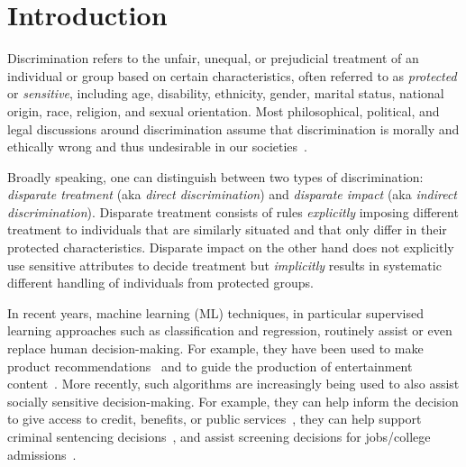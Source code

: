 \documentclass[letterpaper]{article} %
\theoremstyle{definition}
\newcommand{\1}{\ensuremath{{\rm e}}} %
\begin{document}
\section{Introduction}
\label{sec:introduction}

Discrimination refers to the unfair, unequal, or prejudicial treatment of an individual or group based on certain characteristics, often referred to as \emph{protected} or \emph{sensitive}, including age, disability, ethnicity, gender, marital status, national origin, race, religion, and sexual orientation. Most philosophical, political, and legal discussions around discrimination assume that discrimination is morally and ethically wrong and thus undesirable in our societies~\cite{sep-discrimination}. 

Broadly speaking, one can distinguish between two types of discrimination: \emph{disparate treatment} (aka \emph{direct discrimination}) and \emph{disparate impact} (aka \emph{indirect discrimination}). Disparate treatment consists of rules \emph{explicitly} imposing different treatment to individuals that are similarly situated and that only differ in their protected characteristics. Disparate impact on the other hand does not explicitly use sensitive attributes to decide treatment but \emph{implicitly}  results in systematic different handling of individuals from protected groups.

In recent years, machine learning (ML) techniques, in particular supervised learning approaches such as classification and regression, routinely assist or even replace human decision-making. For example, they have been used to make product recommendations~\cite{Finley2016} and to guide the production of entertainment content~\cite{Kumar2018netflix}. More recently, such algorithms are increasingly being used to also assist socially sensitive decision-making. For example, they can help inform the decision to give access to credit, benefits, or public services~\cite{Byrnes2016artificialintollerance}, they can help support criminal sentencing decisions~\cite{Rudin2013policing}, and assist screening decisions for jobs/college admissions~\cite{Miller2015algorithmhire}.
\end{document}
